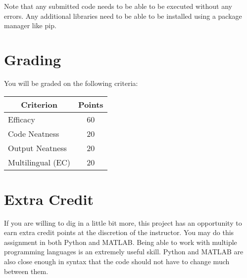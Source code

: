 \documentclass[
	letterpaper, %
	fontsize=10pt, %
	twoside=true, %
	numbers=noenddot, %
]{kaobook}
\begin{document}


Note that any submitted code needs to be able to be executed without any errors. Any additional libraries need to be able to be installed using a package manager like pip.


\section*{Grading}
You will be graded on the following criteria:

\begin{table}[h!]
    \begin{tabular}{l | c}
        \toprule
        \multicolumn{1}{c|}{\textbf{Criterion}} & \textbf{Points} \\
        \midrule
        Efficacy & 60 \\
        Code Neatness & 20 \\
        Output Neatness & 20 \\
        Multilingual (EC) & 20 \\
        \bottomrule
    \end{tabular}
\end{table}

\section*{Extra Credit}
If you are willing to dig in a little bit more, this project has an opportunity to earn extra credit points at the discretion of the instructor.
You may do this assignment in both Python and MATLAB. 
Being able to work with multiple programming languages is an extremely useful skill.
Python and MATLAB are also close enough in syntax that the code should not have to change much between them.
\end{document}
